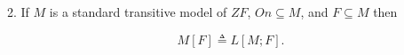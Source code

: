 2. If $M$ is a standard transitive model of $ZF$, $On \subseteq M$, and $F \subseteq M$ then

$$M[F] \triangleq L[M; F].$$

